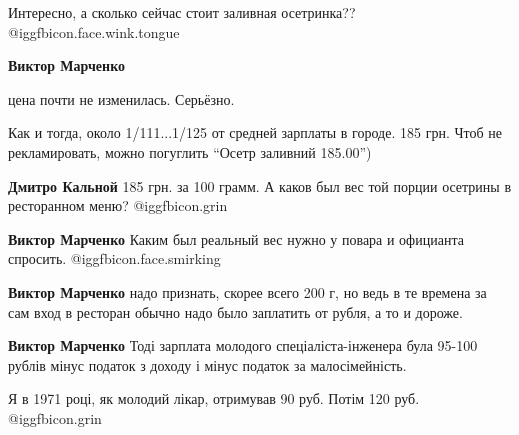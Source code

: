  
 
 
 
 

Интересно, а сколько сейчас стоит заливная осетринка?? @igg{fbicon.face.wink.tongue} 

\textbf{Виктор Марченко} 

цена почти не изменилась. Серьёзно.

Как и тогда, около 1/111...1/125 от средней зарплаты в городе. 185 грн. Чтоб не
рекламировать, можно погуглить \enquote{Осетр заливний 185.00})

\textbf{Дмитро Кальной} 185 грн. за 100 грамм. А каков был вес той порции осетрины в ресторанном меню? @igg{fbicon.grin} 

\textbf{Виктор Марченко} Каким был реальный вес нужно у повара и официанта спросить. @igg{fbicon.face.smirking} 

\textbf{Виктор Марченко} надо признать, скорее всего 200 г, но ведь в те времена за сам вход в ресторан обычно надо было заплатить от рубля, а то и дороже.

\textbf{Виктор Марченко} Тоді зарплата молодого спеціаліста-інженера була 95-100 рублів мінус податок з доходу і мінус податок за малосімейність.

Я в 1971 році, як молодий лікар, отримував 90 руб. Потім 120 руб. @igg{fbicon.grin} 

